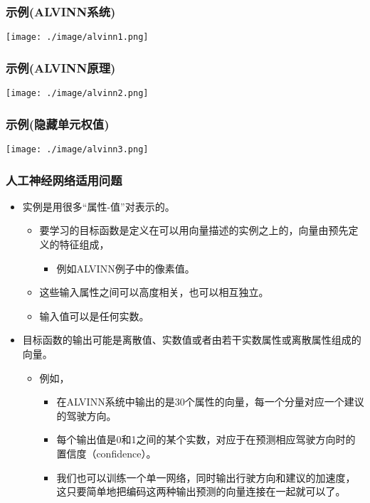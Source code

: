 \documentclass{beamer}
\begin{document}
\begin{frame}
\frametitle{示例(ALVINN系统)}
\label{sec-1-3}

\center
\texttt{[image: ./image/alvinn1.png]}
\end{frame}
\begin{frame}
\frametitle{示例(ALVINN原理)}
\label{sec-1-4}

\center
\texttt{[image: ./image/alvinn2.png]}
\end{frame}
\begin{frame}
\frametitle{示例(隐藏单元权值)}
\label{sec-1-5}

\center
\texttt{[image: ./image/alvinn3.png]}
\end{frame}
\begin{frame}
\frametitle{人工神经网络适用问题}
\label{sec-1-6}


\begin{itemize}
\item 实例是用很多“属性-值”对表示的。
\begin{itemize}
\item 要学习的目标函数是定义在可以用向量描述的实例之上的，向量由预先定义的特征组成，
\begin{itemize}
\item 例如ALVINN例子中的像素值。
\end{itemize}
\item 这些输入属性之间可以高度相关，也可以相互独立。
\item 输入值可以是任何实数。
\end{itemize}
\item 目标函数的输出可能是离散值、实数值或者由若干实数属性或离散属性组成的向量。
\begin{itemize}
\item 例如，
\begin{itemize}
\item 在ALVINN系统中输出的是30个属性的向量，每一个分量对应一个建议的驾驶方向。
\item 每个输出值是0和1之间的某个实数，对应于在预测相应驾驶方向时的置信度（confidence）。
\item 我们也可以训练一个单一网络，同时输出行驶方向和建议的加速度，这只要简单地把编码这两种输出预测的向量连接在一起就可以了。
\end{itemize}
\end{itemize}
\end{itemize}
\end{frame}
\end{document}

